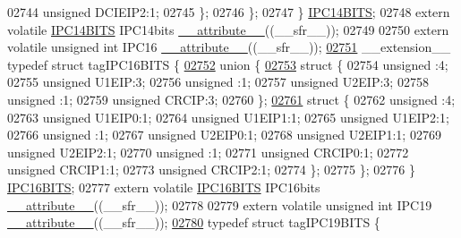 \begin{DoxyCode}
02744       \textcolor{keywordtype}{unsigned} DCIEIP2:1;
02745     \};
02746   \};
02747 \} \hyperlink{a00014_d7/db7/a00525}{IPC14BITS};
02748 \textcolor{keyword}{extern} \textcolor{keyword}{volatile} \hyperlink{a00014_d7/db7/a00525}{IPC14BITS} IPC14bits \hyperlink{a00015_a493c46f03454991ccc5aa7a6e1dfb2a7}{\_\_attribute\_\_}((\_\_sfr\_\_));
02749 
02750 \textcolor{keyword}{extern} \textcolor{keyword}{volatile} \textcolor{keywordtype}{unsigned} \textcolor{keywordtype}{int}  IPC16 \hyperlink{a00015_a493c46f03454991ccc5aa7a6e1dfb2a7}{\_\_attribute\_\_}((\_\_sfr\_\_));
\hypertarget{a00015_source_l02751}{}\hyperlink{a00014}{02751} \_\_extension\_\_ \textcolor{keyword}{typedef} \textcolor{keyword}{struct }tagIPC16BITS \{
\hypertarget{a00015_source_l02752}{}\hyperlink{a00015}{02752}   \textcolor{keyword}{union }\{
\hypertarget{a00015_source_l02753}{}\hyperlink{a00015}{02753}     \textcolor{keyword}{struct }\{
02754       \textcolor{keywordtype}{unsigned} :4;
02755       \textcolor{keywordtype}{unsigned} U1EIP:3;
02756       \textcolor{keywordtype}{unsigned} :1;
02757       \textcolor{keywordtype}{unsigned} U2EIP:3;
02758       \textcolor{keywordtype}{unsigned} :1;
02759       \textcolor{keywordtype}{unsigned} CRCIP:3;
02760     \};
\hypertarget{a00015_source_l02761}{}\hyperlink{a00015}{02761}     \textcolor{keyword}{struct }\{
02762       \textcolor{keywordtype}{unsigned} :4;
02763       \textcolor{keywordtype}{unsigned} U1EIP0:1;
02764       \textcolor{keywordtype}{unsigned} U1EIP1:1;
02765       \textcolor{keywordtype}{unsigned} U1EIP2:1;
02766       \textcolor{keywordtype}{unsigned} :1;
02767       \textcolor{keywordtype}{unsigned} U2EIP0:1;
02768       \textcolor{keywordtype}{unsigned} U2EIP1:1;
02769       \textcolor{keywordtype}{unsigned} U2EIP2:1;
02770       \textcolor{keywordtype}{unsigned} :1;
02771       \textcolor{keywordtype}{unsigned} CRCIP0:1;
02772       \textcolor{keywordtype}{unsigned} CRCIP1:1;
02773       \textcolor{keywordtype}{unsigned} CRCIP2:1;
02774     \};
02775   \};
02776 \} \hyperlink{a00014_d5/d81/a00528}{IPC16BITS};
02777 \textcolor{keyword}{extern} \textcolor{keyword}{volatile} \hyperlink{a00014_d5/d81/a00528}{IPC16BITS} IPC16bits \hyperlink{a00015_a493c46f03454991ccc5aa7a6e1dfb2a7}{\_\_attribute\_\_}((\_\_sfr\_\_));
02778 
02779 \textcolor{keyword}{extern} \textcolor{keyword}{volatile} \textcolor{keywordtype}{unsigned} \textcolor{keywordtype}{int}  IPC19 \hyperlink{a00015_a493c46f03454991ccc5aa7a6e1dfb2a7}{\_\_attribute\_\_}((\_\_sfr\_\_));
\hypertarget{a00015_source_l02780}{}\hyperlink{a00014}{02780} \textcolor{keyword}{typedef} \textcolor{keyword}{struct }tagIPC19BITS \{

\end{DoxyCode}
